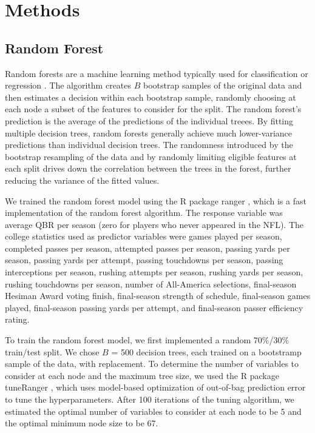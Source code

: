 \documentclass{article}
\begin{document}
\section{Methods}
\label{sec:methods}

\subsection{Random Forest}

Random forests are a machine learning method typically used for classification or regression \citep{breiman_random_2001}. The algorithm creates $B$ bootstrap samples of the original data and then estimates a decision within each bootstrap sample, randomly choosing at each node a subset of the features to consider for the split. The random forest's prediction is the average of the predictions of the individual treees. By fitting multiple decision trees, random forests generally achieve much lower-variance predictions than individual decision trees. The randomness introduced by the bootstrap resampling of the data and by randomly limiting eligible features at each split drives down the correlation between the trees in the forest, further reducing the variance of the fitted values.

We trained the random forest model using the R package ranger \citep{wright_ranger_2015}, which is a fast implementation of the random forest algorithm. The response variable was average QBR per season (zero for players who never appeared in the NFL). The college statistics used as predictor variables were games played per season, completed passes per season, attempted passes per season, passing yards per season, passing yards per attempt, passing touchdowns per season, passing interceptions per season, rushing attempts per season, rushing yards per season, rushing touchdowns per season, number of All-America selections, final-season Hesiman Award voting finish, final-season strength of schedule, final-season games played, final-season passing yards per attempt, and final-season passer efficiency rating.

To train the random forest model, we first implemented a random 70\%/30\% train/test split. We chose $B$ = 500 decision trees, each trained on a bootstramp sample of the data, with replacement. To determine the number of variables to consider at each node and the maximum tree size, we used the R package tuneRanger \citep{probst_tuneranger_2018}, which uses model-based optimization of out-of-bag prediction error to tune the hyperparameters. After 100 iterations of the tuning algorithm, we estimated the optimal number of variables to consider at each node to be 5 and the optimal minimum node size to be 67.
\end{document}
